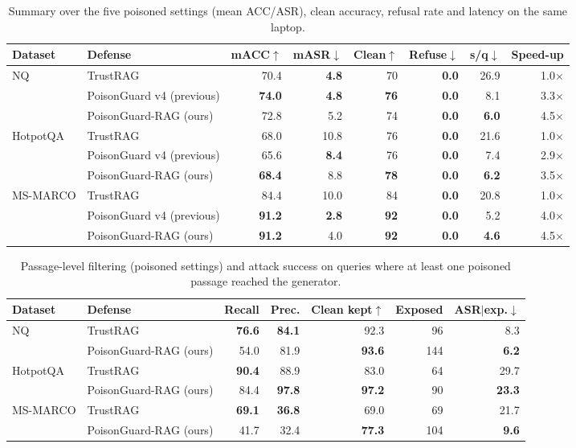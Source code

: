 \begin{table}[t]\centering\small\caption{Summary over the five poisoned settings (mean ACC/ASR), clean accuracy, refusal rate and latency on the same laptop.}\label{tab:summary}
\begin{tabular}{llrrrrrr}\toprule Dataset & Defense & mACC$\uparrow$ & mASR$\downarrow$ & Clean$\uparrow$ & Refuse$\downarrow$ & s/q$\downarrow$ & Speed-up \\\midrule
\multirow{3}{*}{NQ} & TrustRAG & 70.4 & \textbf{4.8} & 70 & \textbf{0.0} & 26.9 & 1.0$\times$ \\
 & PoisonGuard v4 (previous) & \textbf{74.0} & \textbf{4.8} & \textbf{76} & \textbf{0.0} & 8.1 & 3.3$\times$ \\
 & PoisonGuard-RAG (ours) & 72.8 & 5.2 & 74 & \textbf{0.0} & \textbf{6.0} & 4.5$\times$ \\
\midrule
\multirow{3}{*}{HotpotQA} & TrustRAG & 68.0 & 10.8 & 76 & \textbf{0.0} & 21.6 & 1.0$\times$ \\
 & PoisonGuard v4 (previous) & 65.6 & \textbf{8.4} & 76 & \textbf{0.0} & 7.4 & 2.9$\times$ \\
 & PoisonGuard-RAG (ours) & \textbf{68.4} & 8.8 & \textbf{78} & \textbf{0.0} & \textbf{6.2} & 3.5$\times$ \\
\midrule
\multirow{3}{*}{MS-MARCO} & TrustRAG & 84.4 & 10.0 & 84 & \textbf{0.0} & 20.8 & 1.0$\times$ \\
 & PoisonGuard v4 (previous) & \textbf{91.2} & \textbf{2.8} & \textbf{92} & \textbf{0.0} & 5.2 & 4.0$\times$ \\
 & PoisonGuard-RAG (ours) & \textbf{91.2} & 4.0 & \textbf{92} & \textbf{0.0} & \textbf{4.6} & 4.5$\times$ \\
\bottomrule
\end{tabular}\end{table}

\begin{table}[t]\centering\small\caption{Passage-level filtering (poisoned settings) and attack success on queries where at least one poisoned passage reached the generator.}\label{tab:filter}
\begin{tabular}{llrrrrr}\toprule Dataset & Defense & Recall & Prec. & Clean kept$\uparrow$ & Exposed & ASR$|$exp.$\downarrow$ \\\midrule
\multirow{2}{*}{NQ} & TrustRAG & \textbf{76.6} & \textbf{84.1} & 92.3 & 96 & 8.3 \\
 & PoisonGuard-RAG (ours) & 54.0 & 81.9 & \textbf{93.6} & 144 & \textbf{6.2} \\
\midrule
\multirow{2}{*}{HotpotQA} & TrustRAG & \textbf{90.4} & 88.9 & 83.0 & 64 & 29.7 \\
 & PoisonGuard-RAG (ours) & 84.4 & \textbf{97.8} & \textbf{97.2} & 90 & \textbf{23.3} \\
\midrule
\multirow{2}{*}{MS-MARCO} & TrustRAG & \textbf{69.1} & \textbf{36.8} & 69.0 & 69 & 21.7 \\
 & PoisonGuard-RAG (ours) & 41.7 & 32.4 & \textbf{77.3} & 104 & \textbf{9.6} \\
\bottomrule
\end{tabular}\end{table}

